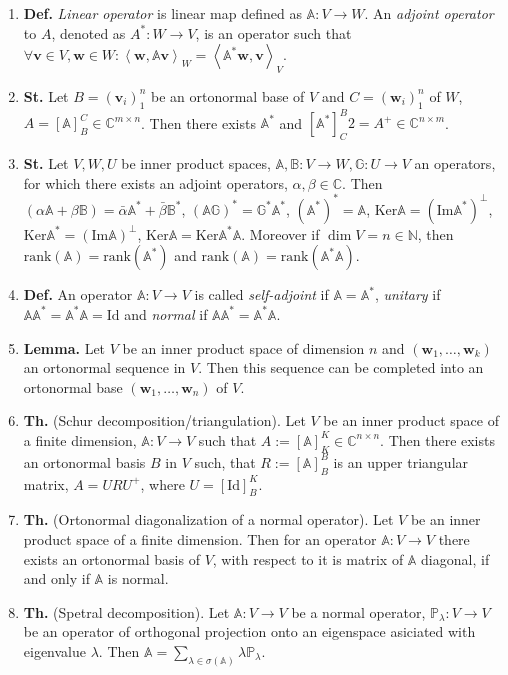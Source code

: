 \documentclass{article}
\newcommand{\<}{\left<}
\renewcommand{\>}{\right>}
\newcommand{\im}{\text{Im}}
\renewcommand{\ker}{\text{Ker}}
\newcommand{\rank}{\text{rank}}
\newcommand{\Id}{\text{Id}}
\newcommand*\op[1]{\mathbb{#1}}
\newcommand{\N}{\mathbb{N}}
\newcommand{\C}{\mathbb{C}}
\newcommand{\define}{\textbf{Def. }}
\newcommand{\lemma}{\textbf{Lemma. }}
\newcommand{\state}{\textbf{St. }}
\newcommand{\theor}{\textbf{Th. }}
\begin{document}
\begin{multicols}{3}
\begin{enumerate}[itemsep=2pt, topsep=2pt, partopsep=2pt, parsep=2pt]
        \item \define \emph{Linear operator} is linear map defined as $\mathbb{A}:V\to W$. An \emph{adjoint operator} to $A$, denoted as $A^*:W\to V$, is an operator such that $\forall \bm v\in V,\bm w\in W:\<\bm w,\mathbb A\bm v\>_W=\<\mathbb A^*\bm w,\bm v\>_V$.
        \item \state Let $B=(\bm v_i)_1^n$ be an ortonormal base of $V$ and $C=(\bm w_i)_1^n$ of $W$, $A=[\mathbb A]_B^C\in\C^{m\times n}$. Then there exists $\mathbb A^*$ and $[\mathbb A^*]_C^B2=A^+\in\C^{n\times m}$.
        \item \state Let $V,W,U$ be inner product spaces, $\mathbb A,\mathbb B:V\to W,\mathbb G:U\to V$ an operators, for which there exists an adjoint operators, $\alpha,\beta\in\C$. Then
         $(\alpha\op{A}+\beta\op{B})=\bar{\alpha}\op{A}^*+\bar{\beta}\op B^*$, $(\op A\op G)^*=\op G^*\op A^*$,
         $(\op A^*)^*=\op A$, $\ker\op A=(\im\op A^*)^\perp$, $\ker\op A^*=(\im\op A)^\perp$, $\ker\op A=\ker\op A^*\op A$. Moreover if $\dim V=n\in\N$, then $\rank(\op A)=\rank(\op A^*)$ and $\rank(\op A)=\rank(\op A^*\op A)$.
        \item \define An operator $\op A:V\to V$ is called \emph{self-adjoint} if $\op A=\op A^*$, \emph{unitary} if $\op A\op A^*=\op A^*\op A=\Id$ and \emph{normal} if $\op A\op A^*=\op A^*\op A$.
        \item \lemma Let $V$ be an inner product space of dimension $n$ and $(\bm w_1,\ldots,\bm w_k)$ an ortonormal sequence in $V$. Then this sequence can be completed into an ortonormal base $(\bm w_1,\ldots,\bm w_n)$ of $V$.
        \item \theor (Schur decomposition/triangulation). Let $V$ be an inner product space of a finite dimension, $\op A:V\to V$ such that $A:=[\op A]_K^K\in\C^{n\times n}$. Then there exists an ortonormal basis $B$ in $V$ such, that $R:=[\op A]_B^B$ is an upper triangular matrix, $A=URU^+$, where $U=[\Id]_B^K$.
        \item \theor (Ortonormal diagonalization of a normal operator). Let $V$ be an inner product space of a finite dimension. Then for an operator $\op A:V\to V$ there exists an ortonormal basis of $V$, with respect to it is matrix of $\op A$ diagonal, if and only if $\op A$ is normal.
        \item \theor (Spetral decomposition). Let $\op A:V\to V$ be a normal operator, $\op P_\lambda:V\to V$ be an operator of orthogonal projection onto an eigenspace asiciated with eigenvalue $\lambda$. Then $\op A=\sum_{\lambda\in\sigma(\op A)}\lambda\op P_\lambda$.

\end{enumerate}
\end{multicols}
\end{document}
